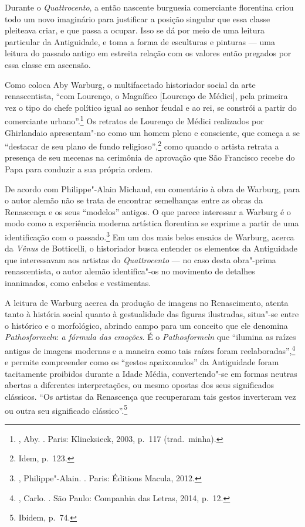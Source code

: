 \asterisc

Durante o \emph{Quattrocento}, a então nascente burguesia comerciante
florentina criou todo um novo imaginário para justificar a
posição singular que essa classe pleiteava criar, e que passa a ocupar.
Isso se dá por meio de uma leitura particular da Antiguidade, e toma a
forma de esculturas e pinturas --- uma leitura do passado antigo em
estreita relação com os valores então pregados por essa classe em
ascensão.

Como coloca Aby Warburg, o multifacetado historiador social da arte
renascentista, ``com Lourenço, o Magnífico {[}Lourenço de
Médici{]}, pela primeira vez o tipo do chefe político igual ao senhor
feudal e ao rei, se constrói a partir do comerciante urbano''.\footnote{, Aby. {}. Paris: Klincksieck, 2003, p.~117 (trad.~minha).}
Os retratos de Lourenço de Médici realizados por Ghirlandaio
apresentam"-no como um homem pleno e consciente, que começa a se
``destacar de seu plano de fundo religioso'',\footnote{Idem, p.~123.}
como quando o artista retrata a presença de seu mecenas na cerimônia de
aprovação que São Francisco recebe do Papa para conduzir a sua própria
ordem.

De acordo com Philippe"-Alain Michaud, em comentário à obra de Warburg,
para o autor alemão não se trata de encontrar semelhanças entre as obras
da Renascença e os seus ``modelos'' antigos. O que parece interessar a Warburg é o modo como a experiência moderna artística florentina se exprime a partir de uma identificação com o passado.\footnote{, Philippe"-Alain. {}. Paris: Éditions Macula, 2012.}
Em um dos mais belos ensaios de Warburg, acerca da
\emph{Vênus} de Botticelli, o historiador busca entender os elementos da
Antiguidade que interessavam aos artistas do \emph{Quattrocento} --- no
caso desta obra"-prima renascentista, o autor alemão identifica"-os no
movimento de detalhes inanimados, como cabelos e vestimentas.

A leitura de Warburg acerca da produção de imagens no Renascimento,
atenta tanto à história social quanto à gestualidade das figuras
ilustradas, situa"-se entre o histórico e o morfológico, abrindo campo
para um conceito que ele denomina \emph{Pathosformeln}:
\emph{a fórmula das emoções}. É o \emph{Pathosformeln} que ``ilumina as
raízes antigas de imagens modernas e a maneira como tais raízes foram
reelaboradas'',\footnote{, Carlo. {}. São Paulo: Companhia das Letras, 2014, p.~12.} e permite compreender como os ``gestos apaixonados'' da Antiguidade foram
tacitamente proibidos durante a Idade Média, convertendo"-se em formas
neutras abertas a diferentes interpretações, ou mesmo opostas dos seus
significados clássicos. ``Os artistas da Renascença que recuperaram tais
gestos inverteram vez ou outra seu significado clássico''.\footnote{Ibidem, p.~74.}

